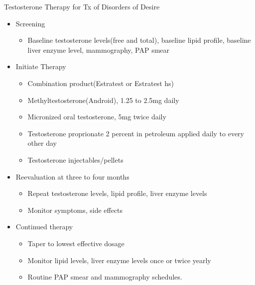 \begin{commentbox}{Testosterone Therapy for Tx of Disorders of Desire}
\begin{itemize}\tightlist
	\item Screening
	\begin{itemize}\tightlist
		\item Baseline testosterone levels(free and total), baseline lipid profile, baseline liver enzyme level, mammography, PAP smear
	\end{itemize}
	\item Initiate Therapy
	\begin{itemize}\tightlist
		\item Combination product(Estratest or Estratest hs)
		\item Methyltestosterone(Android), 1.25 to 2.5mg daily
		\item Micronized oral testosterone, 5mg twice daily
		\item Testosterone proprionate 2 percent in petroleum applied daily to every other day
		\item Testosterone injectables/pellets
	\end{itemize}
	\item Reevaluation at three to four months
	\begin{itemize}\tightlist
		\item Repeat testosterone levels, lipid profile, liver enzyme levels
		\item Monitor symptoms, side effects
	\end{itemize}
	\item Continued therapy
	\begin{itemize}\tightlist
		\item Taper to lowest effective dosage
		\item Monitor lipid levels, liver enzyme levels once or twice yearly
		\item Routine PAP smear and mammography schedules.
	\end{itemize}
\end{itemize}
\end{commentbox}
